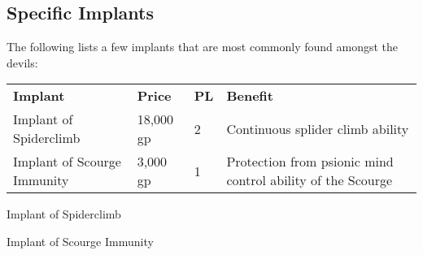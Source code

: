 \subsection{Specific Implants}
\label{sec:items:Implants}

The following lists a few implants that are most commonly found amongst the
devils:

\begin{table*}[!htb]
  \caption{Overview of Implants}
  \begin{tabular}{l l l p{7cm}}
    \textbf{Implant}            & \textbf{Price} & \textbf{PL}  & \textbf{Benefit} \\
    Implant of Spiderclimb      & 18,000 gp      & 2            & Continuous splider climb ability \\
    Implant of Scourge Immunity &  3,000 gp      & 1            & Protection from psionic mind control ability of the Scourge \\
  \end{tabular}
\end{table*}

\begin{35e}{Implant of Spiderclimb}
\end{35e}

\begin{35e}{Implant of Scourge Immunity}
\end{35e}

